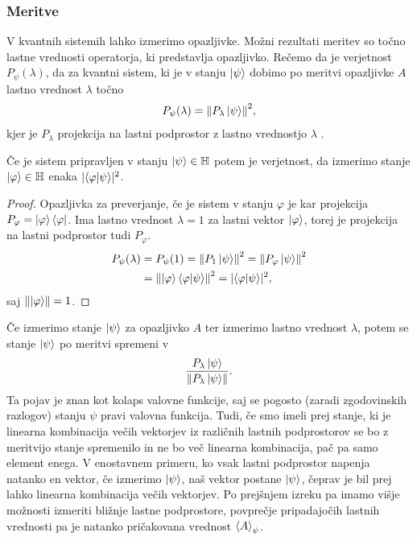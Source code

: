\documentclass[mat1]{fmfdelo}
\newcommand{\Hb}{\mathbb H}
\begin{document}
\subsubsection{Meritve}
V kvantnih sistemih lahko izmerimo opazljivke. Možni rezultati meritev so točno lastne vrednosti operatorja, ki predstavlja opazljivko. Rečemo da je verjetnost \(P_\psi(\lambda)\), da za kvantni sistem, ki je v stanju \(\ket\psi\) dobimo po meritvi opazljivke \(A\) lastno vrednost \(\lambda\) točno 
\begin{align*}
    P_\psi(\lambda) = \norm{P_\lambda \ket\psi}^2,
\end{align*}
kjer je \(P_\lambda\) projekcija na lastni podprostor z lastno vrednostjo \(\lambda\) \cite[Poglavje 2.3.1]{mathforqm}.

\begin{izrek}
    Če je sistem pripravljen v stanju \(\ket\psi \in \Hb\) potem je verjetnost, da izmerimo stanje \(\ket\varphi \in \Hb\) enaka \(\lvert \braket{\varphi}{\psi}\rvert^2\).
\end{izrek}
\begin{proof}
    Opazljivka za preverjanje, če je sistem v stanju \(\varphi\) je kar projekcija \(P_\varphi = \ket\varphi \bra\varphi\). Ima lastno vrednost \(\lambda=1\) za lastni vektor \(\ket\varphi\), torej je projekcija na lastni podprostor tudi \(P_\varphi\).
    \begin{align*}
        P_\psi (\lambda) &= P_\psi(1) =\norm{P_1\ket\psi}^2 = \norm{P_\varphi\ket\psi}^2\\
                        &= \norm{\ket\varphi\braket{\varphi}{\psi}}^2 = \lvert \braket{\varphi}{\psi}\rvert^2,
    \end{align*}
    saj \(\norm{\ket\varphi} = 1\).
\end{proof}

Če izmerimo stanje \(\ket\psi\) za opazljivko \(A\) ter izmerimo lastno vrednost \(\lambda\), potem se stanje \(\ket\psi\) po meritvi spremeni v
\begin{align*}
    \frac{P_\lambda \ket\psi}{\norm{P_\lambda\ket\psi}}.
\end{align*}
Ta pojav je znan kot kolaps valovne funkcije, saj se pogosto (zaradi zgodovinskih razlogov) stanju \(\psi\) pravi valovna funkcija. Tudi, če smo imeli prej stanje, ki je linearna kombinacija večih vektorjev iz različnih lastnih podprostorov se bo z meritvijo stanje spremenilo in ne bo več linearna kombinacija, pač pa samo element enega. V enostavnem primeru, ko vsak lastni podprostor napenja natanko en vektor, če izmerimo \(\ket\psi\), naš vektor postane \(\ket\psi\), čeprav je bil prej lahko linearna kombinacija večih vektorjev. Po prejšnjem izreku pa imamo višje možnosti izmeriti bližnje lastne podprostore, povprečje pripadajočih lastnih vrednosti pa je natanko pričakovana vrednost \(\ev{A}_\psi\).
\end{document}
